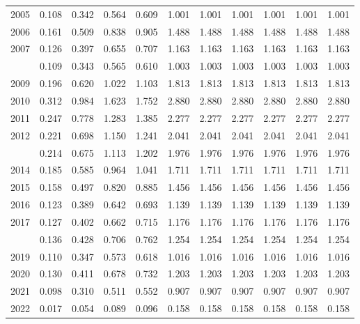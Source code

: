 \documentclass[
]{article}
\begin{document}
\begin{longtable}[t]{lrrrrrrrrrr}
2005 & 0.108 & 0.342 & 0.564 & 0.609 & 1.001 & 1.001 & 1.001 & 1.001 & 1.001 & 1.001\\
2006 & 0.161 & 0.509 & 0.838 & 0.905 & 1.488 & 1.488 & 1.488 & 1.488 & 1.488 & 1.488\\
2007 & 0.126 & 0.397 & 0.655 & 0.707 & 1.163 & 1.163 & 1.163 & 1.163 & 1.163 & 1.163\\
\addlinespace
2008 & 0.109 & 0.343 & 0.565 & 0.610 & 1.003 & 1.003 & 1.003 & 1.003 & 1.003 & 1.003\\
2009 & 0.196 & 0.620 & 1.022 & 1.103 & 1.813 & 1.813 & 1.813 & 1.813 & 1.813 & 1.813\\
2010 & 0.312 & 0.984 & 1.623 & 1.752 & 2.880 & 2.880 & 2.880 & 2.880 & 2.880 & 2.880\\
2011 & 0.247 & 0.778 & 1.283 & 1.385 & 2.277 & 2.277 & 2.277 & 2.277 & 2.277 & 2.277\\
2012 & 0.221 & 0.698 & 1.150 & 1.241 & 2.041 & 2.041 & 2.041 & 2.041 & 2.041 & 2.041\\
\addlinespace
2013 & 0.214 & 0.675 & 1.113 & 1.202 & 1.976 & 1.976 & 1.976 & 1.976 & 1.976 & 1.976\\
2014 & 0.185 & 0.585 & 0.964 & 1.041 & 1.711 & 1.711 & 1.711 & 1.711 & 1.711 & 1.711\\
2015 & 0.158 & 0.497 & 0.820 & 0.885 & 1.456 & 1.456 & 1.456 & 1.456 & 1.456 & 1.456\\
2016 & 0.123 & 0.389 & 0.642 & 0.693 & 1.139 & 1.139 & 1.139 & 1.139 & 1.139 & 1.139\\
2017 & 0.127 & 0.402 & 0.662 & 0.715 & 1.176 & 1.176 & 1.176 & 1.176 & 1.176 & 1.176\\
\addlinespace
2018 & 0.136 & 0.428 & 0.706 & 0.762 & 1.254 & 1.254 & 1.254 & 1.254 & 1.254 & 1.254\\
2019 & 0.110 & 0.347 & 0.573 & 0.618 & 1.016 & 1.016 & 1.016 & 1.016 & 1.016 & 1.016\\
2020 & 0.130 & 0.411 & 0.678 & 0.732 & 1.203 & 1.203 & 1.203 & 1.203 & 1.203 & 1.203\\
2021 & 0.098 & 0.310 & 0.511 & 0.552 & 0.907 & 0.907 & 0.907 & 0.907 & 0.907 & 0.907\\
2022 & 0.017 & 0.054 & 0.089 & 0.096 & 0.158 & 0.158 & 0.158 & 0.158 & 0.158 & 0.158\\*
\end{longtable}
\end{document}
